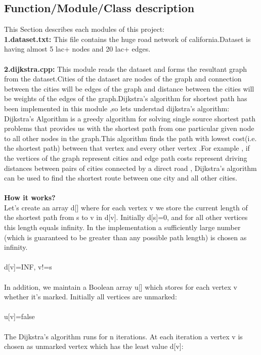 \documentclass[14pt,a4]{extreport}
\begin{document}
\newpage
\subsection{Function/Module/Class description}
This Section describes each modules of this project:\\
\newline
\textbf{1.dataset.txt:}
This file contains the huge road network of california.Dataset is having almost 5 lac+ nodes and 20 lac+ edges.
\\\\
\textbf{2.dijkstra.cpp:}
This module reads the dataset and forms the resultant graph from the dataset.Cities of the dataset are nodes of the graph and connection between the cities will be edges of the graph and distance between the cities will be weights of the edges of the graph.Dijkstra's algorithm for shortest path has been implemented in this module ,so lets understad dijkstra's algorithm:
Dijkstra's Algorithm is a greedy algorithm for solving single source shortest path problems that provides us with the shortest path from one particular given node to all other nodes in the graph.This algorithm finds the path with lowest cost(i.e. the shortest path) between that vertex and every other vertex .For example , if the vertices of the graph represent cities and edge path costs represent driving distances between pairs of cities connected by a direct road , Dijkstra's algorithm can be used to find the shortest route between one city and all other cities.
\\\\
\textbf{How it works?}\\
Let's create an array d[] where for each vertex v we store the current length of the shortest path from s to v in d[v]. Initially d[s]=0, and for all other vertices this length equals infinity. In the implementation a sufficiently large number (which is guaranteed to be greater than any possible path length) is chosen as infinity.\\
\\
           d[v]=INF, v!=s\\
\\
In addition, we maintain a Boolean array u[] which stores for each vertex v whether it's marked. Initially all vertices are unmarked:
\\\\
           u[v]=false\\
\\
The Dijkstra's algorithm runs for n iterations. At each iteration a vertex v is chosen as unmarked vertex which has the least value d[v]:\\
\end{document}
